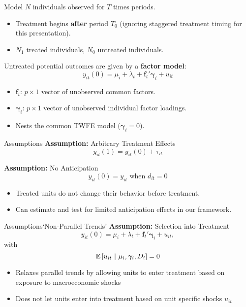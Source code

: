 \documentclass[aspectratio=43,t]{beamer}
\begin{document}
\begin{frame}{Model}
  $N$ individuals observed for $T$ times periods.
  \begin{itemize}
    \item Treatment begins \textbf{after} period $T_0$ (ignoring staggered treatment timing for this presentation).
    \item $N_1$ treated individuals, $N_0$ untreated individuals.
  \end{itemize}

  \pause
  \bigskip
  Untreated potential outcomes are given by a \textbf{factor model}:
  \begin{equation}
    y_{it}(0) = \mu_i + \lambda_t + \bm f_t' \bm \gamma_i + u_{it}
  \end{equation}

  \vspace{-3mm}
  \begin{itemize}
    \item $\bm f_t$: $p \times 1$ vector of unobserved common factors.
    \item $\bm \gamma_i$: $p \times 1$ vector of unobserved individual factor loadings.
    \item Nests the common TWFE model ($\bm \gamma_i = 0$).
  \end{itemize}
\end{frame}

\begin{frame}{Assumptions}
  \textbf{\color{alice} Assumption:} {\color{asher} Arbitrary Treatment Effects}
  \begin{equation}
    y_{it}(1) = y_{it}(0) + \tau_{it}
  \end{equation}


  \bigskip\pause
  \textbf{\color{alice} Assumption:} {\color{asher} No Anticipation}
  $$
    y_{it}(0) = y_{it} \text{ when } d_{it} = 0
  $$

  \begin{itemize}
    \item Treated units do not change their behavior before treatment.
    \item Can estimate and test for limited anticipation effects in our framework.
  \end{itemize}
\end{frame}

\begin{frame}{Assumptions}{`Non-Parallel Trends'}
  \textbf{\color{alice} Assumption:} {\color{asher} Selection into Treatment}
  $$
    y_{it}(0) = \mu_i + \lambda_t + \bm f_t' \bm \gamma_i + u_{it},
  $$
  with
  $$
    \mathbb{E}\left[u_{it} \ \vert \ \mu_i, \bm \gamma_i, D_i\right] = 0
  $$

  \bigskip
  \begin{itemize}
    \item Relaxes parallel trends by allowing units to enter treatment based on exposure to macroeconomic shocks
    
    \item Does not let units enter into treatment based on unit specific shocks $u_{it}$ 
  \end{itemize}
\end{frame}
\end{document}
